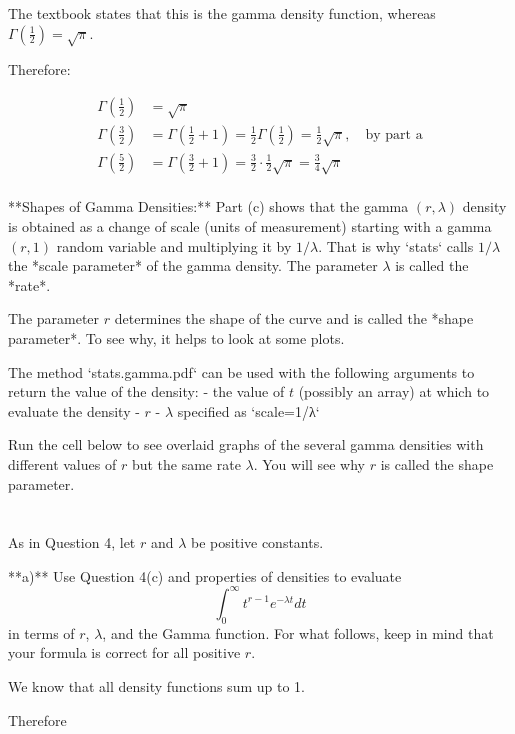 \documentclass{report}
\begin{document}
The textbook states that this is the gamma density function, whereas $ \Gamma(\frac{1}{2}) = \sqrt{\pi} $. 

Therefore: 

\begin{align*}
	\Gamma(\frac{1}{2}) &= \sqrt{\pi} \\
	\Gamma(\frac{3}{2}) &= \Gamma(\frac{1}{2} + 1) = \frac{1}{2}\Gamma(\frac{1}{2}) = \frac{1}{2} \sqrt{\pi}, \quad \text{by part a} \\
	\Gamma(\frac{5}{2}) &= \Gamma(\frac{3}{2} + 1) = \frac{3}{2} \cdot \frac{1}{2}\sqrt{\pi} = \frac{3}{4}\sqrt{\pi}\\
\end{align*}



**Shapes of Gamma Densities:** Part (c) shows that the gamma $(r, \lambda)$ density is obtained as a change of scale (units of measurement) starting with a gamma $(r, 1)$ random variable and multiplying it by $1/\lambda$. That is why `stats` calls $1/\lambda$ the *scale parameter* of the gamma density. The parameter $\lambda$ is called the *rate*.

The parameter $r$ determines the shape of the curve and is called the *shape parameter*. To see why, it helps to look at some plots.

The method `stats.gamma.pdf` can be used with the following arguments to return the value of the density:
- the value of $t$ (possibly an array) at which to evaluate the density
- $r$
- $\lambda$ specified as `scale=1/λ`

Run the cell below to see overlaid graphs of the several gamma densities with different values of $r$ but the same rate $\lambda$. You will see why $r$ is called the shape parameter.

\newpage
\section{} 



As in Question 4, let $r$ and $\lambda$ be positive constants.

**a)** Use Question 4(c) and properties of densities to evaluate
$$
\int_0^\infty t^{r-1}e^{-\lambda t} dt
$$
in terms of $r$, $\lambda$, and the Gamma function. For what follows, keep in mind that your formula is correct for all positive $r$.


We know that all density functions sum up to 1. 

Therefore 
\end{document}
